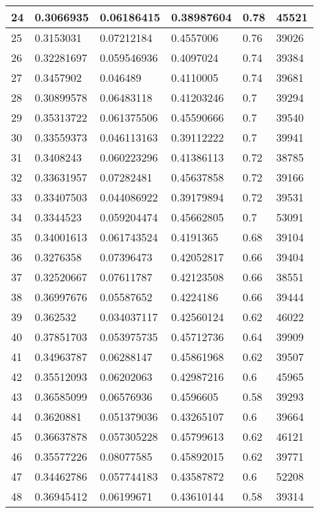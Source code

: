 \begin{longtable}{|l|l|l|l|l|l|}
24 & 0.3066935 & 0.06186415 & 0.38987604 & 0.78 & 45521 \\ \hline 
25 & 0.3153031 & 0.07212184 & 0.4557006 & 0.76 & 39026 \\ \hline 
26 & 0.32281697 & 0.059546936 & 0.4097024 & 0.74 & 39384 \\ \hline 
27 & 0.3457902 & 0.046489 & 0.4110005 & 0.74 & 39681 \\ \hline 
28 & 0.30899578 & 0.06483118 & 0.41203246 & 0.7 & 39294 \\ \hline 
29 & 0.35313722 & 0.061375506 & 0.45590666 & 0.7 & 39540 \\ \hline 
30 & 0.33559373 & 0.046113163 & 0.39112222 & 0.7 & 39941 \\ \hline 
31 & 0.3408243 & 0.060223296 & 0.41386113 & 0.72 & 38785 \\ \hline 
32 & 0.33631957 & 0.07282481 & 0.45637858 & 0.72 & 39166 \\ \hline 
33 & 0.33407503 & 0.044086922 & 0.39179894 & 0.72 & 39531 \\ \hline 
34 & 0.3344523 & 0.059204474 & 0.45662805 & 0.7 & 53091 \\ \hline 
35 & 0.34001613 & 0.061743524 & 0.4191365 & 0.68 & 39104 \\ \hline 
36 & 0.3276358 & 0.07396473 & 0.42052817 & 0.66 & 39404 \\ \hline 
37 & 0.32520667 & 0.07611787 & 0.42123508 & 0.66 & 38551 \\ \hline 
38 & 0.36997676 & 0.05587652 & 0.4224186 & 0.66 & 39444 \\ \hline 
39 & 0.362532 & 0.034037117 & 0.42560124 & 0.62 & 46022 \\ \hline 
40 & 0.37851703 & 0.053975735 & 0.45712736 & 0.64 & 39909 \\ \hline 
41 & 0.34963787 & 0.06288147 & 0.45861968 & 0.62 & 39507 \\ \hline 
42 & 0.35512093 & 0.06202063 & 0.42987216 & 0.6 & 45965 \\ \hline 
43 & 0.36585099 & 0.06576936 & 0.4596605 & 0.58 & 39293 \\ \hline 
44 & 0.3620881 & 0.051379036 & 0.43265107 & 0.6 & 39664 \\ \hline 
45 & 0.36637878 & 0.057305228 & 0.45799613 & 0.62 & 46121 \\ \hline 
46 & 0.35577226 & 0.08077585 & 0.45892015 & 0.62 & 39771 \\ \hline 
47 & 0.34462786 & 0.057744183 & 0.43587872 & 0.6 & 52208 \\ \hline 
48 & 0.36945412 & 0.06199671 & 0.43610144 & 0.58 & 39314 \\ \hline 

\end{longtable}
